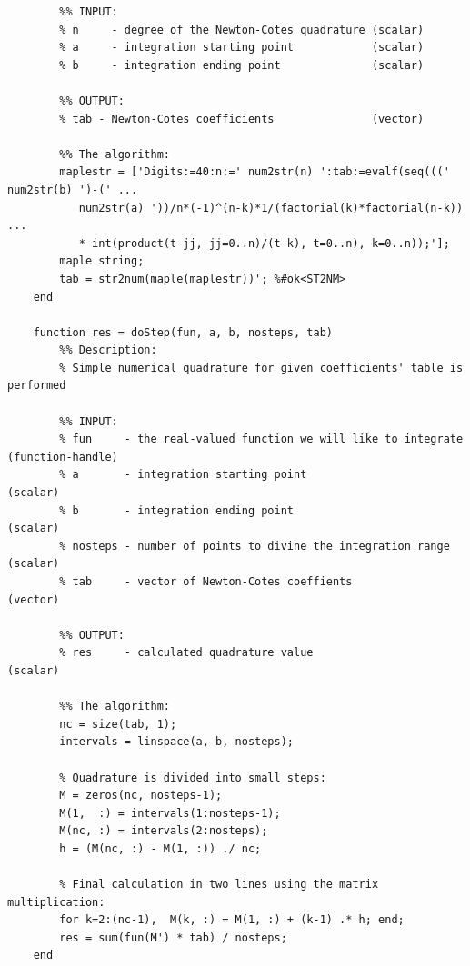 \documentclass[12pt,twoside,a4paper]{article}
\numberwithin{equation}{subsection}
\numberwithin{figure}{subsection}
\begin{document}
\begin{lstlisting}
	    %% INPUT:
	    % n     - degree of the Newton-Cotes quadrature (scalar) 
	    % a     - integration starting point            (scalar)
	    % b     - integration ending point              (scalar)
	    
	    %% OUTPUT:
	    % tab - Newton-Cotes coefficients               (vector)
	    
	    %% The algorithm:
	    maplestr = ['Digits:=40:n:=' num2str(n) ':tab:=evalf(seq(((' num2str(b) ')-(' ...
	       num2str(a) '))/n*(-1)^(n-k)*1/(factorial(k)*factorial(n-k)) ...
	       * int(product(t-jj, jj=0..n)/(t-k), t=0..n), k=0..n));'];
	    maple string;
	    tab = str2num(maple(maplestr))'; %#ok<ST2NM>
	end
	
	function res = doStep(fun, a, b, nosteps, tab)
	    %% Description:
	    % Simple numerical quadrature for given coefficients' table is performed
	    
	    %% INPUT:
	    % fun     - the real-valued function we will like to integrate (function-handle)
	    % a       - integration starting point                         (scalar)
	    % b       - integration ending point                           (scalar)
	    % nosteps - number of points to divine the integration range   (scalar)
	    % tab     - vector of Newton-Cotes coeffients                  (vector) 
	    
	    %% OUTPUT:
	    % res     - calculated quadrature value                        (scalar)
	
	    %% The algorithm:
	    nc = size(tab, 1);
	    intervals = linspace(a, b, nosteps);
	    
	    % Quadrature is divided into small steps:
	    M = zeros(nc, nosteps-1);
	    M(1,  :) = intervals(1:nosteps-1);
	    M(nc, :) = intervals(2:nosteps);
	    h = (M(nc, :) - M(1, :)) ./ nc;
	    
	    % Final calculation in two lines using the matrix multiplication:
	    for k=2:(nc-1),  M(k, :) = M(1, :) + (k-1) .* h; end;
	    res = sum(fun(M') * tab) / nosteps;
	end
\end{lstlisting}
\end{document}
